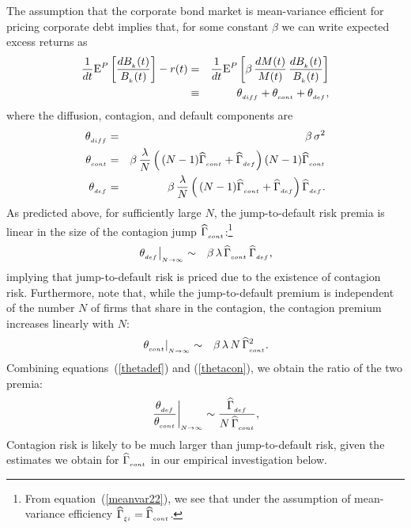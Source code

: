 \documentclass[titlepage,11pt]{article}
\def\big{\begin{array}{c} \\ \end{array} \!\!\!\!\!}
\def\bq{\begin{equation}}
\def\eq{\end{equation}}
\begin{document}
The assumption that the corporate bond market is mean-variance efficient for
pricing corporate debt implies
that, for some constant $\beta$ we can write expected excess returns as
\begin{eqnarray}
\frac{1}{dt}\E^P\left[\frac{dB\sub{k}(t)}{B\sub{k}(t)}\right]-r(t)
&=& \frac{1}{dt}\E^P\left[\beta \, \frac{dM(t)}{M(t)} \,
\frac{dB\sub{k}(t)}{B\sub{k}(t)}\right] \nonumber \\
%
&\equiv& \theta\sub{diff} + \theta\sub{cont} + \theta\sub{def}, \label{mu_bond}
\end{eqnarray}
where the diffusion, contagion, and default components are
\begin{eqnarray}
\theta\sub{diff} &=& \beta \,\sigma^{2}\\ \label{cont87}
%
\theta\sub{cont} &=& \beta \, \frac{\lambda}{N} \left( \big (N-1) \HG\sub{cont}
+ \HG\sub{def} \right)(N-1) \HG\sub{cont}
\\ \label{def87}
%
\theta\sub{def}  &=& \beta \, \frac{\lambda}{N} \left( \big (N-1) \HG\sub{cont}
+
\HG\sub{def} \right) \HG\sub{def}.
\end{eqnarray}
As predicted above, for sufficiently large $N$, the jump-to-default risk premia
is linear in the size of the
contagion jump $ {\widehat \Gamma}_{_{{cont}}}$:\footnote{From equation~(\ref{meanvar22}), we
see that under the assumption of mean-variance
efficiency ${\widehat \Gamma}_{_{{\xi i}}} = {\widehat \Gamma}_{_{{cont}}}$.}
\begin{eqnarray}
\left. \theta_{_{{def}}} \right|_{_{{N \rightarrow \infty}}}  &\sim& \beta \,
\lambda \,
{\widehat \Gamma}_{_{{cont}}} \, {\widehat \Gamma}_{_{{def}}},\label{thetadef}
\end{eqnarray}
implying that jump-to-default risk is priced due to the existence of contagion
risk.
Furthermore, note that, while
the jump-to-default premium is independent of the number $N$ of firms that
share in the contagion,
the contagion premium increases linearly with $N$:
\begin{eqnarray}
\left. \theta_{_{{cont}}} \right|_{_{{N \rightarrow \infty}}}  &\sim & \beta \,
\lambda \,
N \, {\widehat \Gamma}_{_{{cont}}}^{2}.\label{thetacon}
\end{eqnarray}
Combining equations~(\ref{thetadef}) and (\ref{thetacon}), we obtain the ratio
of the
two premia:
 \bq \left.\frac{\theta\sub{def}}{\theta\sub{cont}}\right|\sub{N \rightarrow
\infty} \sim \frac{\HG\sub{def}}{N \, \HG\sub{cont}}, \eq Contagion
risk is likely to be much larger than jump-to-default risk, given
the estimates we obtain for ${\widehat \Gamma}_{_{{cont}}}$ in our empirical
investigation below.
\end{document}
